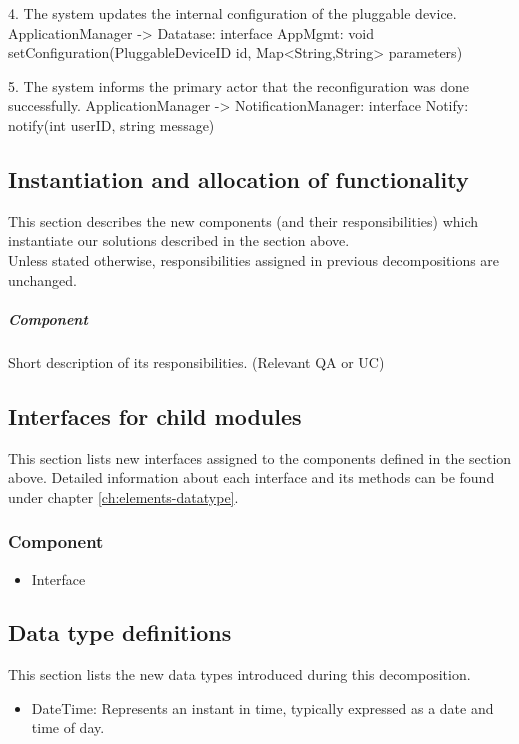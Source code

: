         4. The system updates the internal configuration of the pluggable device.
                ApplicationManager -> Datatase: interface AppMgmt:
                                                     void setConfiguration(PluggableDeviceID id, Map<String,String> parameters) 
            
         5. The system informs the primary actor that the reconfiguration was done successfully.  
                ApplicationManager -> NotificationManager: interface Notify: notify(int userID, string message)      

\subsection{Instantiation and allocation of functionality}
    This section describes the new components (and their responsibilities)
    which instantiate our solutions described in the section above. \\
    Unless stated otherwise, responsibilities assigned in previous decompositions are unchanged.

    \subparagraph{Component}
        Short description of its responsibilities. (Relevant QA or UC)


\subsection{Interfaces for child modules}
    This section lists new interfaces assigned to the components defined
    in the section above. Detailed information about each interface and
    its methods can be found under chapter \ref{ch:elements-datatype}. \\

    \subsubsection{Component}
        \begin{itemize}
            \item Interface
        \end{itemize}

\subsection{Data type definitions}
    This section lists the new data types introduced during this decomposition.

    \begin{itemize}
        \item DateTime: Represents an instant in time, typically expressed as a date and time of day.
    \end{itemize}

